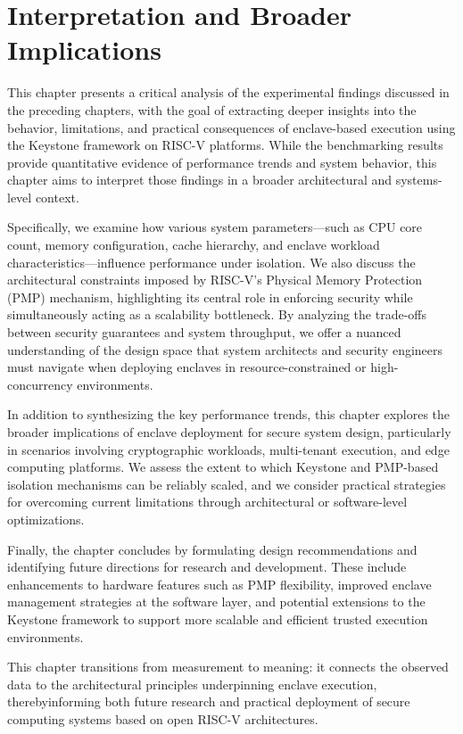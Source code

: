 \chapter{Interpretation and Broader Implications}
\label{chap:discussion}

This chapter presents a critical analysis of the experimental findings discussed in the preceding chapters, with the goal of extracting deeper insights into the behavior, limitations, and practical consequences of enclave-based execution using the Keystone framework on RISC-V platforms. While the benchmarking results provide quantitative evidence of performance trends and system behavior, this chapter aims to interpret those findings in a broader architectural and systems-level context.

Specifically, we examine how various system parameters—such as CPU core count, memory configuration, cache hierarchy, and enclave workload characteristics—influence performance under isolation. We also discuss the architectural constraints imposed by RISC-V's Physical Memory Protection (PMP) mechanism, highlighting its central role in enforcing security while simultaneously acting as a scalability bottleneck. By analyzing the trade-offs between security guarantees and system throughput, we offer a nuanced understanding of the design space that system architects and security engineers must navigate when deploying enclaves in resource-constrained or high-concurrency environments.

In addition to synthesizing the key performance trends, this chapter explores the broader implications of enclave deployment for secure system design, particularly in scenarios involving cryptographic workloads, multi-tenant execution, and edge computing platforms. We assess the extent to which Keystone and PMP-based isolation mechanisms can be reliably scaled, and we consider practical strategies for overcoming current limitations through architectural or software-level optimizations.

Finally, the chapter concludes by formulating design recommendations and identifying future directions for research and development. These include enhancements to hardware features such as PMP flexibility, improved enclave management strategies at the software layer, and potential extensions to the Keystone framework to support more scalable and efficient trusted execution environments.

This chapter transitions from measurement to meaning: it connects the observed data to the architectural principles underpinning enclave execution, therebyinforming both future research and practical deployment of secure computing systems based on open RISC-V architectures.

